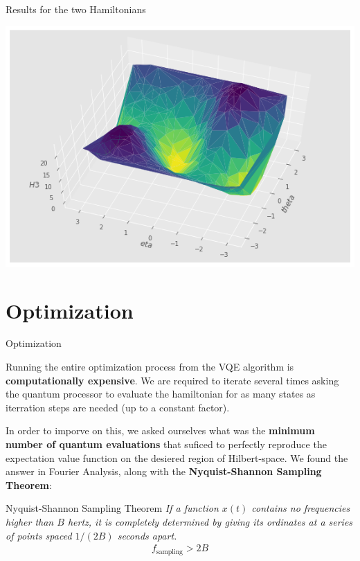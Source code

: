 \documentclass[9pt, handout, aspectratio=169]{beamer}		%
\begin{document}
\begin{frame}{Results for the two Hamiltonians}
\begin{multicols}{2}
			\begin{center}
				\includegraphics[height=.40\paperheight]{Figures/h3_result}
			\end{center}

		\end{multicols}

	\end{frame}


\section{Optimization}

\begin{frame}{Optimization}

	Running the entire optimization process from the VQE algorithm is \textbf{computationally expensive}. We are required to iterate several times asking the quantum processor to evaluate the hamiltonian for as many states as iterration steps are needed (up to a constant factor).

	\medskip

	In order to imporve on this, we asked ourselves what was the \textbf{minimum number of quantum evaluations} that suficed to perfectly reproduce the expectation value function on the desiered region of Hilbert-space. We found the answer in Fourier Analysis, along with the \textbf{Nyquist-Shannon Sampling Theorem}:

	\begin{block}{Nyquist-Shannon Sampling Theorem}
		\emph{If a function $x(t)$ contains no frequencies higher than $B$ hertz, it is completely determined by giving its ordinates at a series of points spaced $1/(2B)$ seconds apart.}
		\medskip
		\begin{align*}
			f_{\text{sampling}} > 2B
		\end{align*}
	\end{block}

\end{frame}
\end{document}
